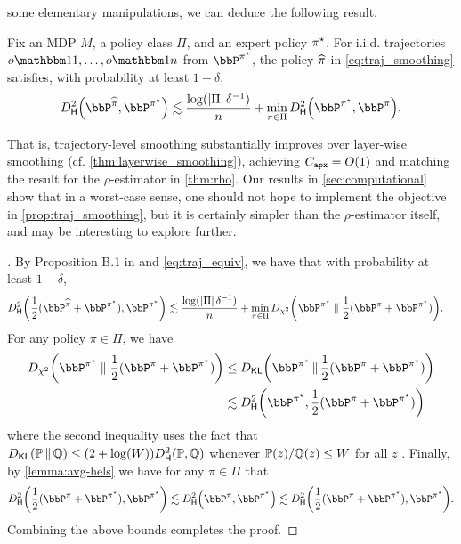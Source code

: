 some elementary manipulations, we can deduce the following result.
\begin{proposition}
  \label{prop:traj_smoothing}
Fix an MDP $M$, a policy class $\Pi$, and an expert policy $\pi^{\star}$. For i.i.d. trajectories $o\ind{1},\dots,o\ind{n}$ from $\bbP^{\pistar}$, the policy $\widehat{\pi}$ in \cref{eq:traj_smoothing} satisfies, with
probability at least $1-\delta$, 
\begin{align}
    \Dhels{\bbP^{\pihat}}{\bbP^{\pistar}} 
  \approxleq{} \frac{\log(\abs{\Pi}\delta^{-1})}{n}
      +   \min_{\pi\in\Pi}\Dhels{\bbP^{\pistar}}{\bbP^{\pi}}.
\end{align}
\end{proposition}
That is, trajectory-level smoothing substantially improves over
layer-wise smoothing (cf. \cref{thm:layerwise_smoothing}), achieving $C_{\texttt{apx}}=O(1)$ and matching the
result for the $\rho$-estimator in \cref{thm:rho}. Our results in \cref{sec:computational} show that in a worst-case
sense, one should not hope to implement the objective in
\cref{prop:traj_smoothing}, but it is certainly simpler than the
$\rho$-estimator itself, and may be interesting to explore further.


\begin{proof}[]
By Proposition B.1 in \citet{foster2024behavior} and \cref{eq:traj_equiv}, we have that with
probability at least $1-\delta$,
\begin{align}
  \label{eq:4}
\Dhels{\frac{1}{2}(\bbP^{\pihat}+\bbP^{\pistar})}{\bbP^{\pistar}}
    &\approxleq{} \frac{\log(\abs{\Pi}\delta^{-1})}{n}
      +
      \min_{\pi\in\Pi}\Dchis{\bbP^{\pistar}}{\frac{1}{2}(\bbP^{\pi}+\bbP^{\pistar})}.
\end{align}
For any policy $\pi\in\Pi$, we have
\begin{align}
  \Dchis{\bbP^{\pistar}}{\frac{1}{2}(\bbP^{\pi}+\bbP^{\pistar})}
  &\leq  \Dkl{\bbP^{\pistar}}{\frac{1}{2}(\bbP^{\pi}+\bbP^{\pistar})} \\ &\lesssim \Dhels{\bbP^{\pistar}}{\frac{1}{2}(\bbP^{\pi}+\bbP^{\pistar})}
\end{align}
where the second inequality uses the fact that $\Dkl{\BP}{\BQ} \leq (2+\log(W))\Dhels{\BP}{\BQ}$ whenever $\mathbb{P}(z)/\mathbb{Q}(z) \leq W$ for all $z$ \citep[Lemma 4]{yang1998asymptotic}. Finally, by \cref{lemma:avg-hels} we have for any $\pi\in\Pi$ that
\[
  \Dhels{\frac{1}{2}(\bbP^{\pi}+\bbP^{\pistar})}{\bbP^{\pistar}} \approxleq{} \Dhels{\bbP^{\pi}}{\bbP^{\pistar}} \approxleq{} \Dhels{\frac{1}{2}(\bbP^{\pi}+\bbP^{\pistar})}{\bbP^{\pistar}}.
\]
Combining the above bounds completes the proof.  
\end{proof}


